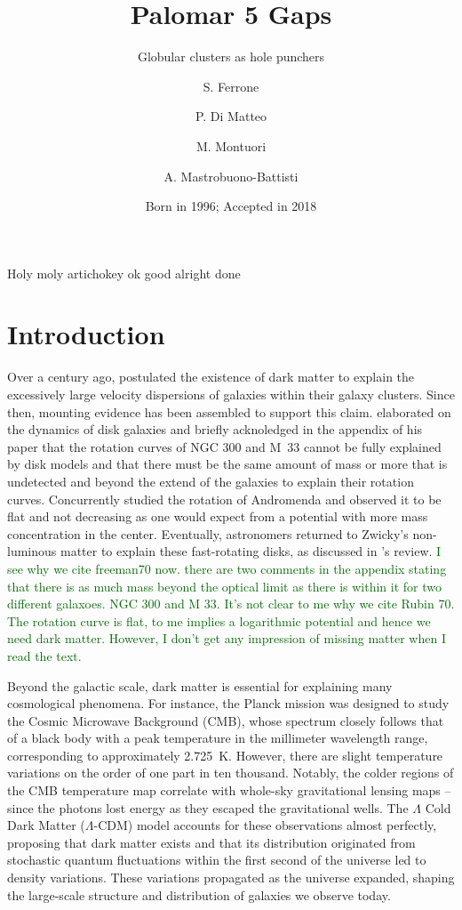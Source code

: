 \documentclass{aa}
\title{Palomar 5 Gaps}
\subtitle{Globular clusters as hole punchers}
\author{S. Ferrone
       \inst{1,2}
       \and
       P. Di Matteo\inst{2}
       \and
       M. Montuori\inst{1}
       \and
       A. Mastrobuono-Battisti
       }
\institute{Dipartimento di Fisica, Universit\`a di Roma ``La Sapienza'',
           Piazza Aldo Moro\\
           \email{salvatore.ferrone@uniroma1.it}
      \and
          Paris Observatory. Paris Sciences et Lettres\\
          \email{c.ptolemy@hipparch.uheaven.space}
          \thanks{The university of heaven temporarily does not
                  accept e-mails}
          }
\date{Born in 1996; Accepted in 2018}
\newcommand{\salvatore}[1]{\textcolor{darkgreen}{{#1}}}
\begin{document}
\abstract
  {Holy moly artichokey}
  {ok}
  {good}
  {alright}
  {done}


\maketitle
\section{Introduction}


  Over a century ago, \citet{1933AcHPh...6..110Z} postulated the existence of dark matter to explain the excessively large velocity dispersions of galaxies within their galaxy clusters. Since then, mounting evidence has been assembled to support this claim. \citet{1970IAUS...38..351F,1970ApJ...161..802F} elaborated on the dynamics of disk galaxies and briefly acknoledged in the appendix of his paper that the rotation curves of NGC 300 and M~33 cannot be fully explained by disk models and that there must be the same amount of mass or more that is undetected and beyond the extend of the galaxies to explain their rotation curves. Concurrently \citet{1970ApJ...159..379R} studied the rotation of Andromenda and observed it to be flat and not decreasing as one would expect from a potential with more mass concentration in the center. Eventually, astronomers returned to Zwicky's non-luminous matter to explain these fast-rotating disks, as discussed in \citet{1983SciAm.248f..96R}'s review. \salvatore{I see why we cite freeman70 now. there are two comments in the appendix stating that there is as much mass beyond the optical limit as there is within it for two different galaxoes. NGC 300 and M 33. It's not clear to me why we cite Rubin 70. The rotation curve is flat, to me implies a logarithmic potential and hence we need dark matter. However, I don't get any impression of missing matter when I read the text.}


  Beyond the galactic scale, dark matter is essential for explaining many cosmological phenomena. For instance, the Planck mission \citep{2020A&A...641A...1P} was designed to study the Cosmic Microwave Background (CMB), whose spectrum closely follows that of a black body with a peak temperature in the millimeter wavelength range, corresponding to approximately 2.725~K. However, there are slight temperature variations on the order of one part in ten thousand. Notably, the colder regions of the CMB temperature map correlate with whole-sky gravitational lensing maps \citep{2020A&A...641A...8P}--since the photons lost energy as they escaped the gravitational wells. The $\Lambda$ Cold Dark Matter ($\Lambda$-CDM) model accounts for these observations almost perfectly, proposing that dark matter exists and that its distribution originated from stochastic quantum fluctuations within the first second of the universe led to density variations. These variations propagated as the universe expanded, shaping the large-scale structure and distribution of galaxies we observe today.
\end{document}
